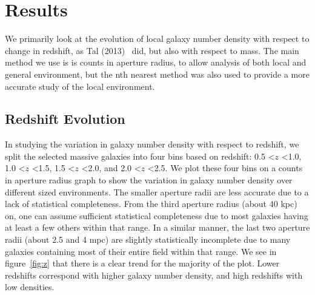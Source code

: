 \documentclass[apj]{emulateapj}
\begin{document}
\section{Results}

We primarily look at the evolution of local galaxy number density with respect to change in redshift, as Tal (2013)~\cite{2013ApJ...769...31T} did, but also with respect to mass. The main method we use is is counts in aperture radius, to allow analysis of both local and general environment, but the nth nearest method was also used to provide a more accurate study of the local environment.

\subsection{Redshift Evolution}

In studying the variation in galaxy number density with respect to redshift, we split the selected massive galaxies into four bins based on redshift: 0.5 \textless  $z$ \textless 1.0, 1.0 \textless  $z$ \textless 1.5, 1.5 \textless  $z$ \textless 2.0, and 2.0 \textless  $z$ \textless 2.5. We plot these four bins on a counts in aperture radius graph to show the variation in galaxy number density over different sized environments. The smaller aperture radii are less accurate due to a lack of statistical completeness. From the third aperture radius (about 40 kpc) on, one can assume sufficient statistical completeness due to most galaxies having at least a few others within that range. In a similar manner, the last two aperture radii (about 2.5 and 4 mpc) are slightly statistically incomplete due to many galaxies containing most of their entire field within that range. We see in figure~\ref{fig:z} that there is a clear trend for the majority of the plot. Lower redshifts correspond with higher galaxy number density, and high redshifts with low densities. 
\end{document}
